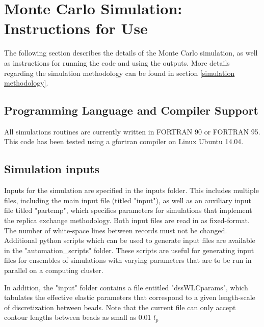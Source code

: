 \documentclass[english]{article}
\begin{document}
\section{Monte Carlo Simulation: Instructions for Use}

The following section describes the details of the Monte Carlo simulation, as well as instructions for running the code and using the outputs. More details regarding the simulation methodology can be found in section \ref{simulation methodology}.

\subsection{Programming Language and Compiler Support}

All simulations routines are currently written in FORTRAN 90 or FORTRAN 95. This code has been tested using a gfortran compiler on Linux Ubuntu 14.04.

\subsection{Simulation inputs}

Inputs for the simulation are specified in the inputs folder. This includes multiple files, including the main input file (titled "input"), as well as an auxiliary input file titled "partemp", which specifies parameters for simulations that implement the replica exchange methodology. Both input files are read in as fixed-format. The number of white-space lines between records must not be changed. Additional python scripts which can be used to generate input files are available in the "automation_scripts" folder. These scripts are useful for generating input files for ensembles of simulations with varying parameters that are to be run in parallel on a computing cluster. 

In addition, the "input" folder contains a file entitled "dssWLCparams", which tabulates the effective elastic parameters that correspond to a given length-scale of discretization between beads. Note that the current file can only accept contour lengths between beads as small as 0.01 $l_p$
\end{document}
